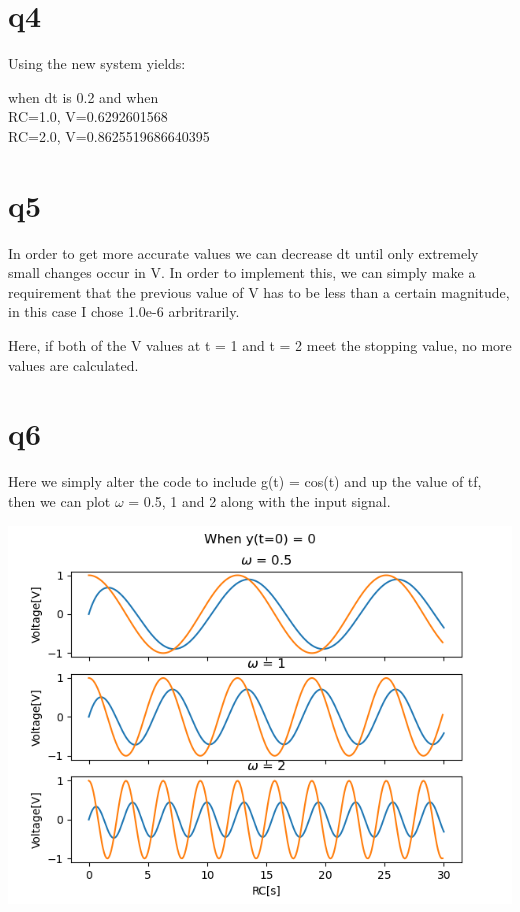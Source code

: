 \documentclass[a4paper,english]{article}
\begin{document}
    \section{q4}
        Using the new system yields:
        \begin{center}
            when dt is 0.2 and when\\
                RC=1.0, V=0.6292601568\\
                RC=2.0, V=0.8625519686640395\\
        \end{center}
    \section{q5}
        In order to get more accurate values we can decrease dt until only extremely small changes occur in V.
        In order to implement this, we can simply make a requirement that the previous value of V has to be less
        than a certain magnitude, in this case I chose 1.0e-6 arbritrarily.
        
        Here, if both of the V values at t = 1 and t = 2 meet the stopping value, no more values are calculated.
    \section{q6}
        Here we simply alter the code to include g(t) = cos(t) and up the value of tf, then we can plot $\omega$ = 0.5, 1 and 2
        along with the input signal.
        
        \includegraphics[scale=0.74]{q6_6_t0.png}
\end{document}
